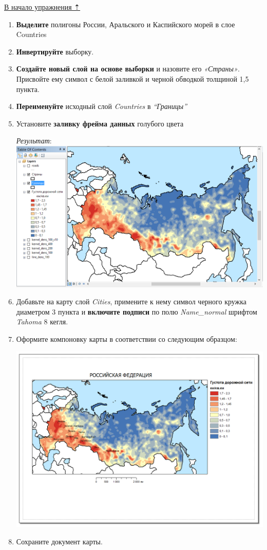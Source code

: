 \documentclass[]{book}
\theoremstyle{definition}
\theoremstyle{definition}
\theoremstyle{definition}
\theoremstyle{remark}
\begin{document}
\protect\hyperlink{density-analysis}{В начало упражнения ⇡}

\begin{enumerate}
\def\labelenumi{\arabic{enumi}.}
\item
  \textbf{Выделите} полигоны России, Аральского и Каспийского морей в
  слое Countries
\item
  \textbf{Инвертируйте} выборку.
\item
  \textbf{Создайте новый слой на основе выборки} и назовите его
  \emph{«Страны»}. Присвойте ему символ с белой заливкой и черной
  обводкой толщиной 1,5 пункта.
\item
  \textbf{Переименуйте} исходный слой \emph{Countries} в
  \emph{``Границы''}
\item
  Установите \textbf{заливку фрейма данных} голубого цвета

  \emph{Результат}: \includegraphics{images/Ex15/image18.png}
\item
  Добавьте на карту слой \emph{Cities}, примените к нему символ черного
  кружка диаметром 3 пункта и \textbf{включите подписи} по полю
  \emph{Name\_normal} шрифтом \emph{Tahoma} 8 кегля.
\item
  Оформите компоновку карты в соответствии со следующим образцом:

  \includegraphics{images/Ex15/image19.png}
\item
  Сохраните документ карты.
\end{enumerate}
\end{document}
